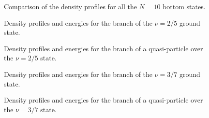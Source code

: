 \begin{figure}
\epsfxsize=14cm \centerline{}
\caption{Comparison of the density profiles for all
the $N=10$ bottom states.}
\label{fig100}
\end{figure}

\begin{figure}
\epsfxsize=14cm \centerline{}
\caption{Density profiles and energies for the branch 
of the $\nu=2/5$ ground state.}
\label{fig101}
\end{figure}

\begin{figure}
\epsfxsize=14cm \centerline{}
\caption{Density profiles and energies for the branch 
of a quasi-particle over the $\nu=2/5$ state.}
\label{fig102}
\end{figure}

\begin{figure}
\epsfxsize=14cm \centerline{}
\caption{Density profiles and energies for the branch 
of the $\nu=3/7$ ground state.}
\label{fig11}
\end{figure}

\begin{figure}
\epsfxsize=14cm \centerline{}
\caption{Density profiles and energies for the branch 
of a quasi-particle over the $\nu=3/7$ state.}
\label{fig12}
\end{figure}





